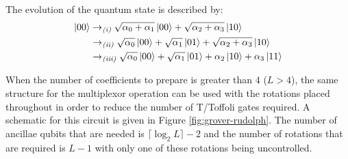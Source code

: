 The evolution of the quantum state is described by:
\begin{equation}
    \begin{split}
        \ket{00} &\rightarrow_{\textit{(i)}} \sqrt{\alpha_0 + \alpha_1} \ket{00} + \sqrt{\alpha_2 + \alpha_3} \ket{10} \\
        &\rightarrow_{\textit{(ii)}} \sqrt{\alpha_0} \ket{00} + \sqrt{\alpha_1} \ket{01} + \sqrt{\alpha_2 + \alpha_3} \ket{10} \\
        &\rightarrow_{\textit{(iii)}} \sqrt{\alpha_0} \ket{00} + \sqrt{\alpha_1} \ket{01} + \alpha_2 \ket{10} + \alpha_3 \ket{11}
    \end{split}
\end{equation}

When the number of coefficients to prepare is greater than $4$ ($L > 4$), the same structure for the multiplexor operation can be used with the rotations placed throughout in order to reduce the number of T/Toffoli gates required.
A schematic for this circuit is given in Figure \ref{fig:grover-rudolph}. 
The number of ancillae qubits that are needed is $\lceil \log_2{L} \rceil - 2$ and the number of rotations that are required is $L - 1$ with only one of these rotations being uncontrolled.

